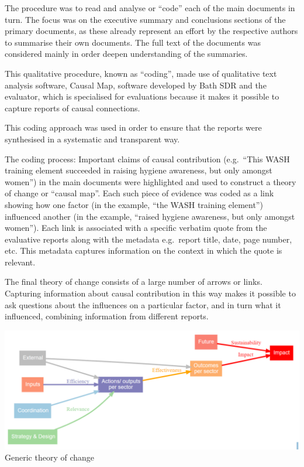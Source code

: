\documentclass[
]{book}
\begin{document}
The procedure was to read and analyse or ``code'' each of the main documents in turn.
The focus was on the executive summary and conclusions sections of the primary
documents, as these already represent an effort by the respective authors to summarise
their own documents. The full text of the documents was considered mainly in order
deepen understanding of the summaries.

This qualitative procedure, known as ``coding'', made use of qualitative text analysis
software, Causal Map, software developed by Bath SDR and the evaluator, which is
specialised for evaluations because it makes it possible to capture reports of causal
connections.

This coding approach was used in order to ensure that the reports were
synthesised in a systematic and transparent way.

The coding process: Important claims of causal contribution (e.g.~``This WASH training
element succeeded in raising hygiene awareness, but only amongst women'') in the main
documents were highlighted and used to construct a theory of change or ``causal map''.
Each such piece of evidence was coded as a link showing how one factor (in the example,
``the WASH training element'') influenced another (in the example, ``raised hygiene
awareness, but only amongst women''). Each link is associated with a specific verbatim
quote from the evaluative reports along with the metadata e.g.~report title, date, page
number, etc. This metadata captures information on the context in which the quote is
relevant.

The final theory of change consists of a large number of arrows or links.\\
Capturing information about causal contribution in this way makes it possible to ask
questions about the influences on a particular factor, and in turn what it influenced,
combining information from different reports.

\includegraphics{_assets/ff6196596cc415b9eec16a64ed3d02bb.png}
Generic theory of change
\end{document}
